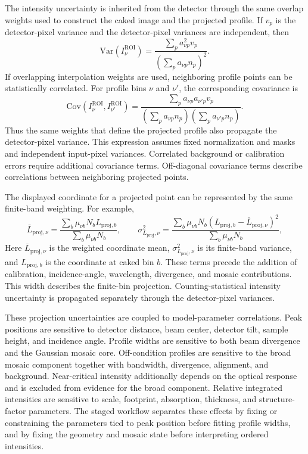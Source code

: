 The intensity uncertainty is inherited from the detector through the same overlap weights used to construct the caked image and the projected profile. If $v_p$ is the detector-pixel variance and the detector-pixel variances are independent, then
\begin{equation}
\mathrm{Var}\!\left(I_{\nu}^{\mathrm{ROI}}\right)=
\frac{\sum_p a_{\nu p}^{2}v_p}
     {\left(\sum_p a_{\nu p}n_p\right)^2}.
\end{equation}
If overlapping interpolation weights are used, neighboring profile points can be statistically correlated. For profile bins $\nu$ and $\nu'$, the corresponding covariance is
\begin{equation}
\mathrm{Cov}\!\left(I_{\nu}^{\mathrm{ROI}},I_{\nu'}^{\mathrm{ROI}}\right)=
\frac{\sum_p a_{\nu p}a_{\nu'p}v_p}
     {\left(\sum_p a_{\nu p}n_p\right)
      \left(\sum_p a_{\nu'p}n_p\right)}.
\end{equation}
Thus the same weights that define the projected profile also propagate the detector-pixel variance. This expression assumes fixed normalization and masks and independent input-pixel variances. Correlated background or calibration errors require additional covariance terms. Off-diagonal covariance terms describe correlations between neighboring projected points.

The displayed coordinate for a projected point can be represented by the same finite-band weighting. For example,
\begin{equation}
\bar L_{\mathrm{proj},\nu}=\frac{\sum_b \mu_{\nu b}N_bL_{\mathrm{proj},b}}{\sum_b \mu_{\nu b}N_b},
\qquad
\sigma^2_{L_{\mathrm{proj}},\nu}=\frac{\sum_b \mu_{\nu b}N_b(L_{\mathrm{proj},b}-\bar L_{\mathrm{proj},\nu})^2}{\sum_b \mu_{\nu b}N_b},
\end{equation}
Here $\bar L_{\mathrm{proj},\nu}$ is the weighted coordinate mean, $\sigma^2_{L_{\mathrm{proj}},\nu}$ is its finite-band variance, and $L_{\mathrm{proj},b}$ is the coordinate at caked bin $b$. These terms precede the addition of calibration, incidence-angle, wavelength, divergence, and mosaic contributions. This width describes the finite-bin projection. Counting-statistical intensity uncertainty is propagated separately through the detector-pixel variances.

These projection uncertainties are coupled to model-parameter correlations. Peak positions are sensitive to detector distance, beam center, detector tilt, sample height, and incidence angle. Profile widths are sensitive to both beam divergence and the Gaussian mosaic core. Off-condition profiles are sensitive to the broad mosaic component together with bandwidth, divergence, alignment, and background. Near-critical intensity additionally depends on the optical response and is excluded from evidence for the broad component. Relative integrated intensities are sensitive to scale, footprint, absorption, thickness, and structure-factor parameters. The staged workflow separates these effects by fixing or constraining the parameters tied to peak position before fitting profile widths, and by fixing the geometry and mosaic state before interpreting ordered intensities.

